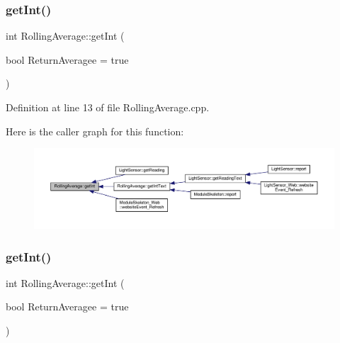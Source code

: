 \mbox{\label{class_rolling_average_a4fc812fc5b678f41c4a01d79c7fc5923}} 
\subsubsection{\texorpdfstring{get\+Int()}{getInt()}\hspace{0.1cm}{\footnotesize\ttfamily [1/2]}}
{\footnotesize\ttfamily int Rolling\+Average\+::get\+Int (\begin{DoxyParamCaption}\item[{bool}]{Return\+Averagee = {\ttfamily true} }\end{DoxyParamCaption})}



Definition at line 13 of file Rolling\+Average.\+cpp.

Here is the caller graph for this function\+:
\nopagebreak
\begin{figure}[H]
\begin{center}
\leavevmode
\includegraphics[width=350pt]{class_rolling_average_a4fc812fc5b678f41c4a01d79c7fc5923_icgraph}
\end{center}
\end{figure}
\mbox{\label{class_rolling_average_a4fc812fc5b678f41c4a01d79c7fc5923}} 
\subsubsection{\texorpdfstring{get\+Int()}{getInt()}\hspace{0.1cm}{\footnotesize\ttfamily [2/2]}}
{\footnotesize\ttfamily int Rolling\+Average\+::get\+Int (\begin{DoxyParamCaption}\item[{bool}]{Return\+Averagee = {\ttfamily true} }\end{DoxyParamCaption})}


